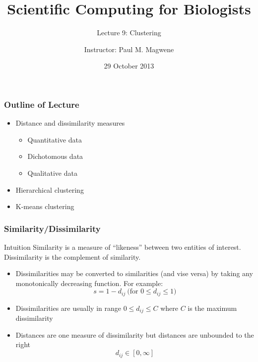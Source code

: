 \documentclass{beamer}
\title{Scientific Computing for Biologists}
\subtitle{Lecture 9: Clustering}
\author{Instructor: Paul M. Magwene}
\date{29 October 2013}
\begin{document}
\begin{frame}
\titlepage
\end{frame}



\begin{frame}
  \frametitle{Outline of Lecture}
  
\begin{itemize}
    \item Distance and dissimilarity measures
    \begin{itemize}
        \item Quantitative data
        \item Dichotomous data
        \item Qualitative data
    \end{itemize}
    \item Hierarchical clustering
    \item K-means clustering
\end{itemize}     
  
\end{frame}

\begin{frame}
  \frametitle{Similarity/Dissimilarity}

\begin{block}{Intuition}
Similarity is a measure of ``likeness'' between two entities of interest. Dissimilarity is the complement of similarity.
\end{block}


\begin{itemize}
\item Dissimilarities may be converted to similarities (and vise versa) by taking any monotonically decreasing function. For example:
\[
s = 1 - d_{ij}  \ \mbox{(for $0 \leq d_{ij} \leq 1$)}
\]
\item Dissimilarities are usually in range $0 \leq d_{ij} \leq C$ where $C$ is the maximum dissimilarity
\item Distances are one measure of dissimilarity but distances are unbounded to the right
\[
d_{ij} \in [0,\infty]
\]
\end{itemize}
\end{frame}
\end{document}
